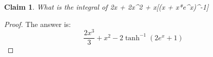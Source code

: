 \documentclass{article}
\newtheorem{theorem}{Claim}
\begin{document}
\begin{theorem}
What is the integral of 2x + 2x^2 + x[(x + x*e^x)^-1]
\end{theorem}

\begin{proof}
The answer is:
\[
\frac{2 x^3}{3}+x^2-2 \tanh ^{-1}\left(2 e^x+1\right)
\]
\end{proof}
\end{document}
